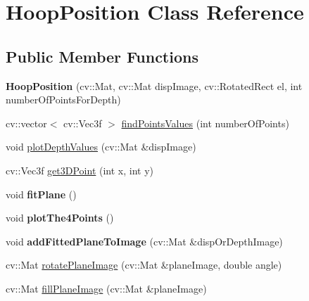 \hypertarget{classHoopPosition}{
\section{HoopPosition Class Reference}
\label{classHoopPosition}
}
\subsection*{Public Member Functions}
\begin{DoxyCompactItemize}
\item 
\hypertarget{classHoopPosition_a16bf0bae8de490c22bee97dd6b4a7eb9}{
{\bfseries HoopPosition} (cv::Mat, cv::Mat dispImage, cv::RotatedRect el, int numberOfPointsForDepth)}
\label{classHoopPosition_a16bf0bae8de490c22bee97dd6b4a7eb9}

\item 
cv::vector$<$ cv::Vec3f $>$ \hyperlink{classHoopPosition_a20ee55da5edf2dcc8f6025bee7c732f9}{findPointsValues} (int numberOfPoints)
\item 
void \hyperlink{classHoopPosition_abd490310645d556510a8af20b9ffedd9}{plotDepthValues} (cv::Mat \&dispImage)
\item 
cv::Vec3f \hyperlink{classHoopPosition_a557a2efd60c963b5c608adec34d8a4c3}{get3DPoint} (int x, int y)
\item 
\hypertarget{classHoopPosition_afa5de685d826744f74e0c4c446f7a9ac}{
void {\bfseries fitPlane} ()}
\label{classHoopPosition_afa5de685d826744f74e0c4c446f7a9ac}

\item 
\hypertarget{classHoopPosition_aafe183d2dc781e8132deae9ea2d2ba6a}{
void {\bfseries plotThe4Points} ()}
\label{classHoopPosition_aafe183d2dc781e8132deae9ea2d2ba6a}

\item 
\hypertarget{classHoopPosition_a329d4a3bb699fadc746cda104b2e5b5a}{
void {\bfseries addFittedPlaneToImage} (cv::Mat \&dispOrDepthImage)}
\label{classHoopPosition_a329d4a3bb699fadc746cda104b2e5b5a}

\item 
cv::Mat \hyperlink{classHoopPosition_a2c5b2c808f5d6f5eb07ddddc8cca349a}{rotatePlaneImage} (cv::Mat \&planeImage, double angle)
\item 
cv::Mat \hyperlink{classHoopPosition_a0fb499507d77004d72777c0981d31cd5}{fillPlaneImage} (cv::Mat \&planeImage)
\end{DoxyCompactItemize}
